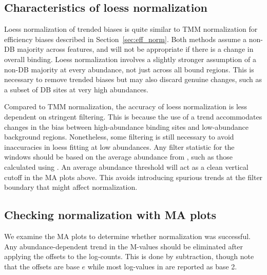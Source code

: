 \documentclass{report}\usepackage[]{graphicx}\usepackage[usenames,dvipsnames]{color}
\begin{document}
\subsection{Characteristics of loess normalization}
Loess normalization of trended biases is quite similar to TMM normalization for efficiency biases described in Section~\ref{sec:eff_norm}.
Both methods assume a non-DB majority across features, and will not be appropriate if there is a change in overall binding.
Loess normalization involves a slightly stronger assumption of a non-DB majority at every abundance, not just across all bound regions.
This is necessary to remove trended biases but may also discard genuine changes, such as a subset of DB sites at very high abundances.

Compared to TMM normalization, the accuracy of loess normalization is less dependent on stringent filtering.
This is because the use of a trend accommodates changes in the bias between high-abundance binding sites and low-abundance background regions.
Nonetheless, some filtering is still necessary to avoid inaccuracies in loess fitting at low abundances.
Any filter statistic for the windows should be based on the average abundance from , such as those calculated using .
An average abundance threshold will act as a clean vertical cutoff in the MA plots above. 
This avoids introducing spurious trends at the filter boundary that might affect normalization.

\subsection{Checking normalization with MA plots}
We examine the MA plots to determine whether normalization was successful.
Any abundance-dependent trend in the M-values should be eliminated after applying the offsets to the log-counts.
This is done by subtraction, though note that the offsets are base $e$ while most log-values in  are reported as base 2.
\end{document}
